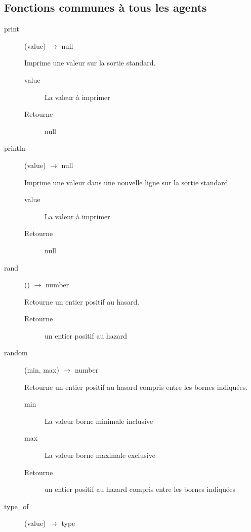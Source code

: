 \subsection{Fonctions communes à tous les agents}

\begin{description}
	\item[print] (value) $\rightarrow$ null

	Imprime une valeur sur la sortie standard.

	\begin{description}
		\item[value] La valeur à imprimer
		\item[Retourne] null
	\end{description}

	\item[println] (value) $\rightarrow$ null

	Imprime une valeur dans une nouvelle ligne sur la sortie standard.

	\begin{description}
		\item[value] La valeur à imprimer
		\item[Retourne] null
	\end{description}

	\item[rand] () $\rightarrow$ number

	Retourne un entier positif au hasard.

	\begin{description}
		\item[Retourne] un entier positif au hazard
	\end{description}

	\item[random] (min, max) $\rightarrow$ number

	Retourne un entier positif au hasard compris entre les bornes indiquées.

	\begin{description}
		\item[min] La valeur borne minimale inclusive
		\item[max] La valeur borne maximale exclusive
		\item[Retourne] un entier positif au hazard compris entre les bornes indiquées
	\end{description}

	\item[type\_of] (value) $\rightarrow$ type


\end{description}
